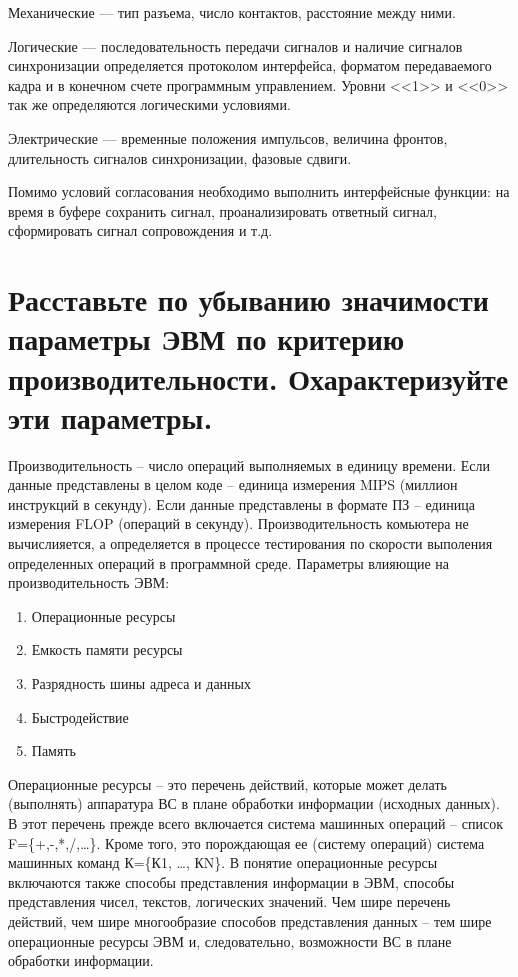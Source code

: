 \documentclass[unicode, 12pt, a4paper, oneside]{article}
\begin{document}
Механические --- тип разъема, число контактов, расстояние между ними.

Логические --- последовательность передачи сигналов и наличие сигналов синхронизации определяется протоколом интерфейса, форматом передаваемого кадра и в конечном счете программным управлением. Уровни <<1>> и <<0>> так же определяются логическими условиями.

Электрические --- временные положения импульсов, величина фронтов, длительность сигналов синхронизации, фазовые сдвиги.

Помимо условий согласования необходимо выполнить интерфейсные функции: на время в буфере сохранить сигнал, проанализировать ответный сигнал, сформировать сигнал сопровождения и т.д.

\section{Расставьте по убыванию значимости параметры ЭВМ по критерию производительности. Охарактеризуйте эти параметры.}

Производительность – число операций выполняемых в единицу времени. Если данные представлены в целом коде – единица измерения MIPS (миллион инструкций в секунду). Если данные представлены в  формате ПЗ – единица измерения FLOP (операций в секунду). Производительность комьютера не вычислияется, а определяется в процессе тестирования по скорости выполения определенных операций в программной среде.
Параметры влияющие на производительность ЭВМ:
\begin{enumerate}
\item Операционные ресурсы
\item Емкость памяти ресурсы
\item Разрядность шины адреса и данных
\item Быстродействие
\item Память
\end{enumerate}

Операционные ресурсы – это перечень действий, которые может делать (выполнять) аппаратура ВС в плане обработки информации (исходных данных). В этот перечень прежде всего включается система машинных операций – список F=\{+,-,*,/,…\}. Кроме того, это порождающая ее (систему операций) система машинных команд К=\{К1, …, КN\}. В понятие операционные ресурсы включаются также способы представления информации в ЭВМ, способы представления чисел, текстов, логических значений. Чем шире перечень действий, чем шире многообразие способов представления данных – тем шире операционные ресурсы ЭВМ и, следовательно, возможности ВС в плане обработки информации.
\end{document}

